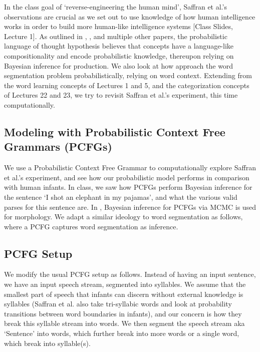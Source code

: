\documentclass{article}
\begin{document}
In the class goal of `reverse-engineering the human mind', Saffran et al.'s observations are crucial as we set out to use knowledge of how human intelligence works in order to build more human-like intelligence systems [Class Slides, Lecture 1]. As outlined in \citet{Goodman2014ConceptsIA}, \citet{Goodmand&Tenenbaum2016}, \citet{Tenenbaum2012} and multiple other papers, the probabilistic language of thought hypothesis believes that concepts have a language-like compositionality and encode probabilistic knowledge, thereupon relying on Bayesian inference for production. We also look at how \citet{GOLDWATER200921} approach the word segmentation problem probabilistically, relying on word context. Extending from the word learning concepts of Lectures 1 and 5, and the categorization concepts of Lectures 22 and 23, we try to revisit Saffran et al.'s experiment, this time computationally.
\subsection{Modeling with Probabilistic Context Free Grammars (PCFGs)}
We use a Probabilistic Context Free Grammar to computationally explore Saffran et al.'s experiment, and see how our probabilistic model performs in comparison with human infants. In class, we saw how PCFGs perform Bayesian inference for the sentence `I shot an elephant in my pajamas', and what the various valid parses for this sentence are. In \citet{Johnson2007BayesianIF}, Bayesian inference for PCFGs via MCMC is used for morphology. We adapt a similar ideology to word segmentation as follows, where a PCFG captures word segmentation as inference.

\subsection{PCFG Setup}
We modify the usual PCFG setup as follows. Instead of having an input sentence, we have an input speech stream, segmented into syllables. We assume that the smallest part of speech that infants can discern without external knowledge is syllables (Saffran et al. also take tri-syllabic words and look at probability transitions between word boundaries in infants), and our concern is how they break this syllable stream into words. We then segment the speech stream aka `Sentence' into words, which further break into more words or a single word, which break into syllable(s).
\end{document}
